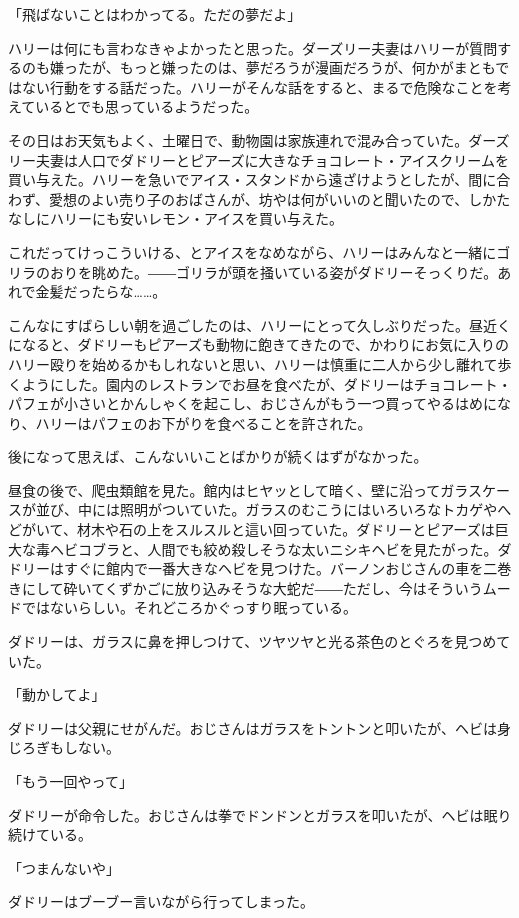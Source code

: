 \documentclass[10pt,a4paper]{article}
\begin{document}
\begin{CJK}{UTF8}{min}
「飛ばないことはわかってる。ただの夢だよ」

ハリーは何にも言わなきゃよかったと思った。ダーズリー夫妻はハリーが質問するのも嫌ったが、もっと嫌ったのは、夢だろうが漫画だろうが、何かがまともではない行動をする話だった。ハリーがそんな話をすると、まるで危険なことを考えているとでも思っているようだった。

その日はお天気もよく、土曜日で、動物園は家族連れで混み合っていた。ダーズリー夫妻は人口でダドリーとピアーズに大きなチョコレート・アイスクリームを買い与えた。ハリーを急いでアイス・スタンドから遠ざけようとしたが、間に合わず、愛想のよい売り子のおばさんが、坊やは何がいいのと聞いたので、しかたなしにハリーにも安いレモン・アイスを買い与えた。

これだってけっこういける、とアイスをなめながら、ハリーはみんなと一緒にゴリラのおりを眺めた。――ゴリラが頭を掻いている姿がダドリーそっくりだ。あれで金髪だったらな……。

こんなにすばらしい朝を過ごしたのは、ハリーにとって久しぶりだった。昼近くになると、ダドリーもピアーズも動物に飽きてきたので、かわりにお気に入りのハリー殴りを始めるかもしれないと思い、ハリーは慎重に二人から少し離れて歩くようにした。園内のレストランでお昼を食べたが、ダドリーはチョコレート・パフェが小さいとかんしゃくを起こし、おじさんがもう一つ買ってやるはめになり、ハリーはパフェのお下がりを食べることを許された。

後になって思えば、こんないいことばかりが続くはずがなかった。

昼食の後で、爬虫類館を見た。館内はヒヤッとして暗く、壁に沿ってガラスケースが並び、中には照明がついていた。ガラスのむこうにはいろいろなトカゲやへどがいて、材木や石の上をスルスルと這い回っていた。ダドリーとピアーズは巨大な毒ヘビコブラと、人間でも絞め殺しそうな太いニシキヘビを見たがった。ダドリーはすぐに館内で一番大きなヘビを見つけた。バーノンおじさんの車を二巻きにして砕いてくずかごに放り込みそうな大蛇だ――ただし、今はそういうムードではないらしい。それどころかぐっすり眠っている。

ダドリーは、ガラスに鼻を押しつけて、ツヤツヤと光る茶色のとぐろを見つめていた。

「動かしてよ」

ダドリーは父親にせがんだ。おじさんはガラスをトントンと叩いたが、ヘビは身じろぎもしない。

「もう一回やって」

ダドリーが命令した。おじさんは拳でドンドンとガラスを叩いたが、ヘビは眠り続けている。

「つまんないや」

ダドリーはブーブー言いながら行ってしまった。


\end{CJK}
\end{document}
